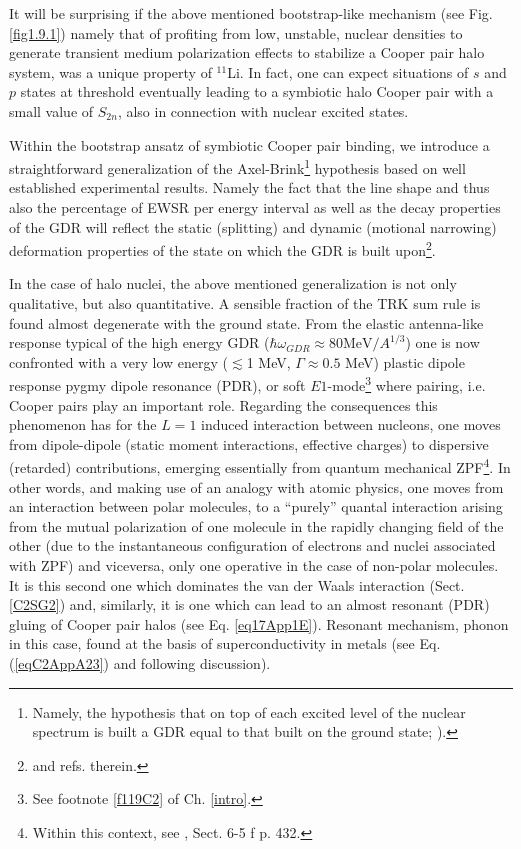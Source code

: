 It will be surprising if the above mentioned  bootstrap-like mechanism (see Fig. \ref{fig1.9.1})  namely that of profiting from  low, unstable, nuclear densities to generate transient medium polarization effects to stabilize a Cooper pair halo system, was a unique property of $^{11}$Li. In fact, one can expect  situations of $s$ and $p$ states at threshold eventually leading to a symbiotic halo Cooper pair with a small value of $S_{2n}$, also in connection with  nuclear excited states. 





 
Within the bootstrap ansatz of symbiotic Cooper pair binding, we introduce a straightforward generalization of the Axel-Brink\footnote{Namely, the hypothesis that on top of each excited level of the nuclear spectrum is built a GDR equal to that built on the ground state; \cite{Axel:62,Brink:55}).} hypothesis based on  well established experimental    results. Namely the fact that the line shape and thus also the percentage of EWSR per energy interval as well as the decay properties of the GDR will reflect the static (splitting) and dynamic (motional narrowing) deformation properties of the state on which the GDR is built upon\footnote{\cite{LeTourneaux:65,Bohr:75,Bortignon:98} and refs. therein.}.

In the case of halo nuclei, the above mentioned generalization is not only qualitative, but also  quantitative. A sensible fraction of the TRK sum rule is found almost degenerate with the ground state. From the elastic antenna-like response typical of the high energy GDR ($\hbar\omega_{GDR}\approx80\text{MeV}/A^{1/3}$)  one is now confronted with a very low energy ($\lesssim$1 MeV, $\Gamma\approx0.5$ MeV) plastic dipole response pygmy dipole resonance (PDR), or soft $E1$-mode\footnote{See footnote \ref{f119C2} of Ch. \ref{intro}.} where pairing, i.e. Cooper pairs play an important role. Regarding the consequences this phenomenon has for the $L=1$ induced interaction between nucleons, one moves from dipole-dipole (static moment interactions, effective charges) to dispersive (retarded) contributions, emerging essentially from quantum mechanical ZPF\footnote{Within this context, see \cite{Bohr:75}, Sect. 6-5 f p. 432.}. In other words, and making use of an analogy with atomic physics, one moves from an interaction between polar molecules, to a ``purely'' quantal interaction arising from the mutual polarization of one molecule in the rapidly changing field of the other (due to the instantaneous configuration of electrons and nuclei associated with ZPF) and viceversa, only one operative in the case of non-polar molecules. It is this second one which dominates the van der Waals interaction (Sect. \ref{C2SG2}) and, similarly, it is one which can lead to an almost resonant (PDR) gluing of Cooper pair halos (see Eq. \ref{eq17App1E}). Resonant mechanism, phonon in this case,  found  at the basis of superconductivity in metals (see Eq. (\ref{eqC2AppA23}) and  following discussion). 

